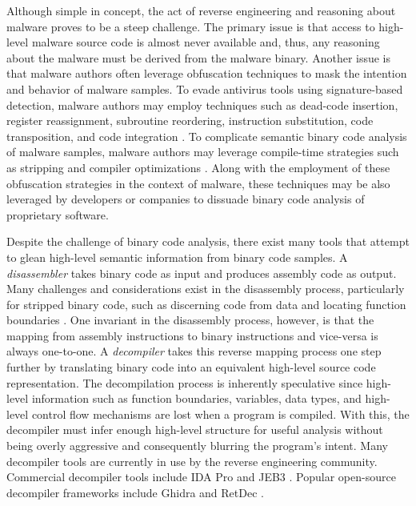 Although simple in concept, the act of reverse engineering and reasoning about malware proves to be a steep challenge. The primary issue is that access to high-level malware source code is almost never available and, thus, any reasoning about the malware must be derived from the malware binary. Another issue is that malware authors often leverage obfuscation techniques to mask the intention and behavior of malware samples. To evade antivirus tools using signature-based detection, malware authors may employ techniques such as dead-code insertion, register reassignment, subroutine reordering, instruction substitution, code transposition, and code integration \cite{bib:malware-obfuscation-techniques}. To complicate semantic binary code analysis of malware samples, malware authors may leverage compile-time strategies such as stripping and compiler optimizations \cite{bib:practical-analysis-stripped-binary-code}. Along with the employment of these obfuscation strategies in the context of malware, these techniques may be also leveraged by developers or companies to dissuade binary code analysis of proprietary software.

Despite the challenge of binary code analysis, there exist many tools that attempt to glean high-level semantic information from binary code samples. A \emph{disassembler} takes binary code as input and produces assembly code as output. Many challenges and considerations exist in the disassembly process, particularly for stripped binary code, such as discerning code from data and locating function boundaries \cite{bib:disassembly-challenges}. One invariant in the disassembly process, however, is that the mapping from assembly instructions to binary instructions and vice-versa is always one-to-one. A \emph{decompiler} takes this reverse mapping process one step further by translating binary code into an equivalent high-level source code representation. The decompilation process is inherently speculative since high-level information such as function boundaries, variables, data types, and high-level control flow mechanisms are lost when a program is compiled. With this, the decompiler must infer enough high-level structure for useful analysis without being overly aggressive and consequently blurring the program's intent. Many decompiler tools are currently in use by the reverse engineering community. Commercial decompiler tools include IDA Pro \cite{bib:ida} and JEB3 \cite{bib:jeb}. Popular open-source decompiler frameworks include Ghidra \cite{bib:ghidra} and RetDec \cite{bib:retdec}.

